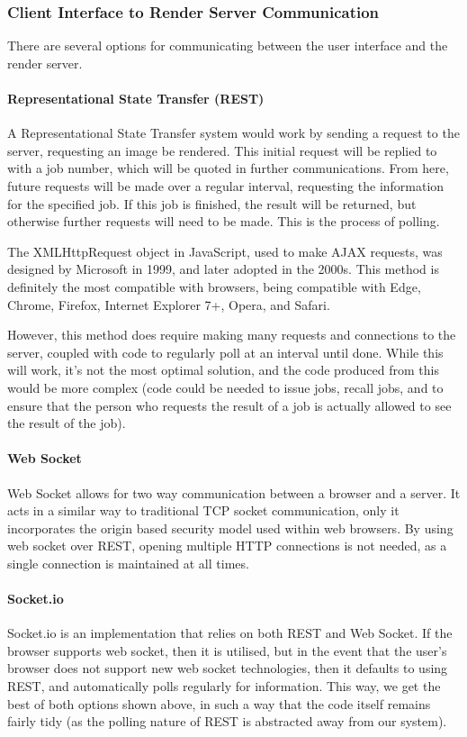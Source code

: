 \documentclass[12pt,a4paper]{article}
\begin{document}
  \subsubsection{Client Interface to Render Server Communication}
There are several options for communicating between the user interface and the render server.

\paragraph{Representational State Transfer (REST)}
A Representational State Transfer system would work by sending a request to the server,
requesting an image be rendered. This initial request will be replied to with a job number,
which will be quoted in further communications. From here, future requests will be made
over a regular interval, requesting the information for the specified job. If this job is finished,
the result will be returned, but otherwise further requests will need to be made. This is the process
of polling.

The XMLHttpRequest object in JavaScript, used to make AJAX requests, was designed by Microsoft
in 1999, and later adopted in the 2000s.
This method is definitely the most compatible with browsers, being compatible with Edge, Chrome,
Firefox, Internet Explorer 7+, Opera, and Safari. \cite{XMLHttpRequestMozilla}

However, this method does require making many requests and connections to the server,
coupled with code to regularly poll at an interval until done. While this will work, it's not the most
optimal solution, and the code produced from this would be more complex (code could be needed to issue jobs, recall jobs,
and to ensure that the person who requests the result of a job is actually allowed to see the result of the job).

\paragraph{Web Socket}
Web Socket allows for two way communication between a browser and a server. It acts in a similar
way to traditional TCP socket communication, only it incorporates the origin based security
model used within web browsers. By using web socket over REST, opening multiple HTTP connections
is not needed, as a single connection is maintained at all times. \cite{WebSocketProtocol}

\paragraph{Socket.io}
Socket.io is an implementation that relies on both REST and Web Socket.
If the browser supports web socket, then it is utilised, but in the event that the
user's browser does not support new web socket technologies, then it defaults to
using REST, and automatically polls regularly for information. This way, we get the
best of both options shown above, in such a way that the code itself remains fairly
tidy (as the polling nature of REST is abstracted away from our system).
\end{document}
